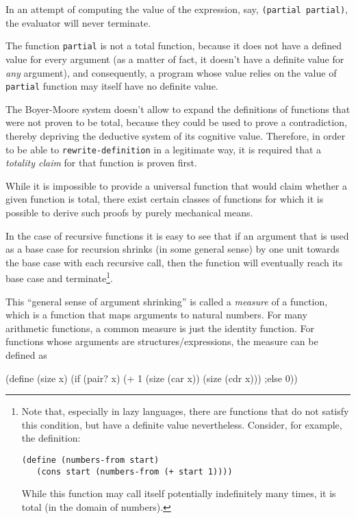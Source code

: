 In an attempt of computing the value of the expression, say,
\texttt{(partial partial)}, the evaluator will never terminate.

The function \texttt{partial} is not a total function, because it
does not have a defined value for every argument (as a matter of fact,
it doesn't have a definite value for \textit{any} argument), and consequently,
a program whose value relies on the value of \texttt{partial} function may
itself have no definite value.

The Boyer-Moore system doesn't allow to expand the definitions
of functions that were not proven to be total, because they could be
used to prove a contradiction\cite{FriedmanEastlund2015}, thereby
depriving the deductive system of its cognitive value. Therefore, in
order to be able to \texttt{rewrite-definition} in a legitimate way,
it is required that a \textit{totality claim} for that function is proven
first.

While it is impossible to provide a universal function that would claim
whether a given function is total, there exist certain classes of functions
for which it is possible to derive such proofs by purely mechanical means.

In the case of recursive functions it is easy to see that if an argument
that is used as a base case for recursion shrinks (in some general sense)
by one unit towards the base case with each recursive call, then
the function will eventually reach its base case and terminate\footnote{
  Note that, especially in lazy languages, there are functions that
  do not satisfy this condition, but have a definite value nevertheless.
  Consider, for example, the definition:
  
  \texttt{(define (numbers-from start) \\
    \-\ \ \ (cons start (numbers-from (+ start 1))))
  }

  While this function may call itself potentially indefinitely many times,
  it is total (in the domain of numbers).
}.

This ``general sense of argument shrinking'' is called a \textit{measure}
of a function, which is a function that maps arguments to natural numbers.
For many arithmetic functions, a common measure is just the identity
function. For functions whose arguments are structures/expressions, the
measure can be defined as

\begin{Snippet}
  (define (size x)
    (if (pair? x)
      (+ 1 (size (car x)) (size (cdr x)))
    ;else
      0))
\end{Snippet}


